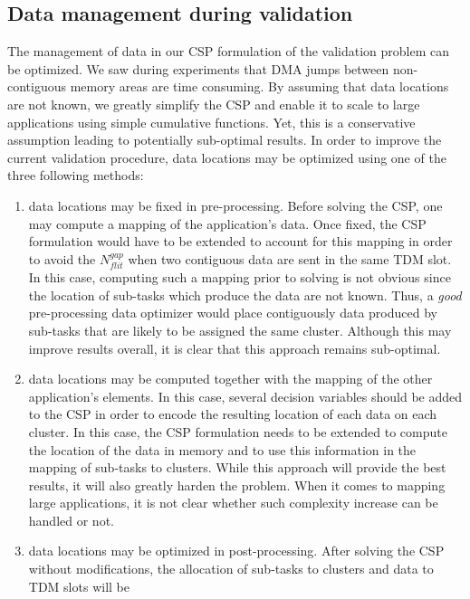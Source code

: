 \documentclass[main.tex]{subfiles}
\begin{document}
\subsection{Data management during validation} The management of data in our
CSP formulation of the validation problem can be optimized. We saw during
experiments that DMA jumps between non-contiguous memory areas are time
consuming. By assuming that data locations are not known, we greatly simplify
the CSP and enable it to scale to large applications using simple cumulative
functions. Yet, this is a conservative assumption leading to potentially
sub-optimal results. In order to improve the current validation procedure, data
locations may be optimized using one of the three following methods:
\begin{enumerate} 
    \item data locations may be fixed in pre-processing. Before
        solving the CSP, one may compute a mapping of the application's data.
        Once fixed, the CSP formulation would have to be extended to account
        for this mapping in order to avoid the $N_{flit}^{gap}$ when two
        contiguous data are sent in the same TDM slot. In this case, computing
        such a mapping prior to solving is not obvious since the location of
        sub-tasks which produce the data are not known. Thus, a \emph{good}
        pre-processing data optimizer would place contiguously data produced by
        sub-tasks that are likely to be assigned the same cluster. Although
        this may improve results overall, it is clear that this approach
        remains sub-optimal.  
    \item data locations may be computed together with the mapping of the
        other application's elements. In this case, several decision variables
        should be added to the CSP in order to encode the resulting location of
        each data on each cluster. In this case, the CSP formulation needs to
        be extended to compute the location of the data in memory and to use
        this information in the mapping of sub-tasks to clusters. While this
        approach will provide the best results, it will also greatly harden the
        problem. When it comes to mapping large applications, it is not clear
        whether such complexity increase can be handled or not.  
    \item data locations may be optimized in
        post-processing. After solving the CSP without modifications, the
        allocation of sub-tasks to clusters and data to TDM slots will be

\end{enumerate}
\end{document}

